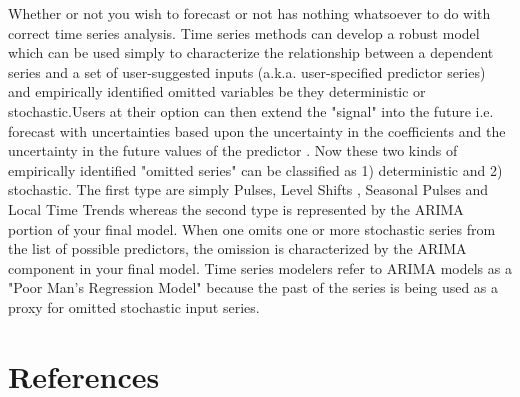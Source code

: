 \documentclass{article}\usepackage[]{graphicx}\usepackage[]{color}
\begin{document}
Whether or not you wish to forecast or not has nothing whatsoever to do with correct time series analysis. Time series methods can develop a robust model which can be used simply to characterize the relationship between a dependent series and a set of user-suggested inputs (a.k.a. user-specified predictor series) and empirically identified omitted variables be they deterministic or stochastic.Users at their option can then extend the "signal" into the future i.e. forecast with uncertainties based upon the uncertainty in the coefficients and the uncertainty in the future values of the predictor . Now these two kinds of empirically identified "omitted series" can be classified as 1) deterministic and 2) stochastic. The first type are simply Pulses, Level Shifts , Seasonal Pulses and Local Time Trends whereas the second type is represented by the ARIMA portion of your final model. When one omits one or more stochastic series from the list of possible predictors, the omission is characterized by the ARIMA component in your final model. Time series modelers refer to ARIMA models as a "Poor Man's Regression Model" because the past of the series is being used as a proxy for omitted stochastic input series.

\section{References}


\end{document}
